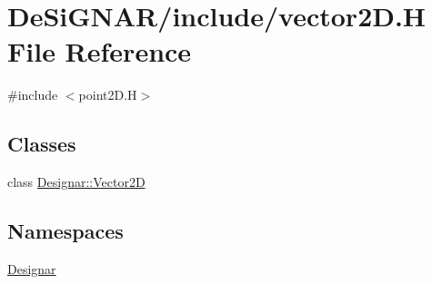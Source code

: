 \hypertarget{vector2_d_8_h}{}\section{De\+Si\+G\+N\+A\+R/include/vector2D.H File Reference}
\label{vector2_d_8_h}
{\ttfamily \#include $<$point2\+D.\+H$>$}\newline
\subsection*{Classes}
\begin{DoxyCompactItemize}
\item 
class \hyperlink{class_designar_1_1_vector2_d}{Designar\+::\+Vector2D}
\end{DoxyCompactItemize}
\subsection*{Namespaces}
\begin{DoxyCompactItemize}
\item 
 \hyperlink{namespace_designar}{Designar}
\end{DoxyCompactItemize}
